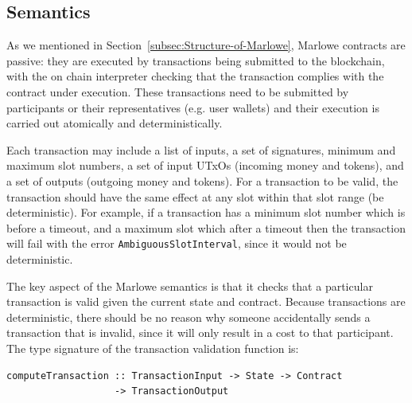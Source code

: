 \documentclass[english,runningheads]{llncs}
\begin{document}
\subsection{Semantics\label{subsec:Marlowe-Semantics}}

As we mentioned in Section~\ref{subsec:Structure-of-Marlowe}, Marlowe
contracts are passive: they are executed by transactions being submitted
to the blockchain, with the on chain interpreter checking that the
transaction complies with the contract under execution. These transactions
need to be submitted by participants or their representatives (e.g.
user wallets) and their execution is carried out atomically and deterministically.

Each transaction may include a list of inputs, a set of signatures,
minimum and maximum slot numbers, a set of input UTxOs (incoming money
and tokens), and a set of outputs (outgoing money and tokens). For
a transaction to be valid, the transaction should have the same effect
at any slot within that slot range (be deterministic). For example,
if a transaction has a minimum slot number which is before a timeout,
and a maximum slot which after a timeout then the transaction will
fail with the error \texttt{AmbiguousSlotInterval}, since it would
not be deterministic.

The key aspect of the Marlowe semantics is that it checks that a particular
transaction is valid given the current state and contract. Because
transactions are deterministic, there should be no reason why someone
accidentally sends a transaction that is invalid, since it will only
result in a cost to that participant. The type signature of the transaction
validation function is:

\begin{verbatim}
computeTransaction :: TransactionInput -> State -> Contract
                   -> TransactionOutput 
\end{verbatim}
\end{document}
